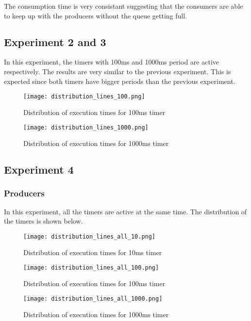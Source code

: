 \documentclass[12pt, a4paper]{report}
\begin{document}
The consumption time is very consistant suggesting that the consumers
are able to keep up with the producers without the queue getting full.

\newpage
\subsection*{Experiment 2 and 3}

In this experiment, the timers with 100ms and 1000ms period are active respectively.
The results are very similar to the previous experiment. This is expected since
both timers have bigger periods than the previous experiment.

\begin{figure}[H]
    \centering
    \texttt{[image: distribution\_lines\_100.png]}
    \caption{Distribution of execution times for 100ms timer}
\end{figure}

\begin{figure}[H]
    \centering
    \texttt{[image: distribution\_lines\_1000.png]}
    \caption{Distribution of execution times for 1000ms timer}
\end{figure}

\newpage
\subsection*{Experiment 4}

\subsubsection*{Producers}

In this experiment, all the timers are active at the same time. 
The distribution of the timers is shown below.

\begin{figure}[H]
    \centering
    \texttt{[image: distribution\_lines\_all\_10.png]}
    \caption{Distribution of execution times for 10ms timer}
\end{figure}

\begin{figure}[H]
    \centering
    \texttt{[image: distribution\_lines\_all\_100.png]}
    \caption{Distribution of execution times for 100ms timer}
\end{figure}

\begin{figure}[H]
    \centering
    \texttt{[image: distribution\_lines\_all\_1000.png]} 
    \caption{Distribution of execution times for 1000ms timer}
\end{figure}
\end{document}
